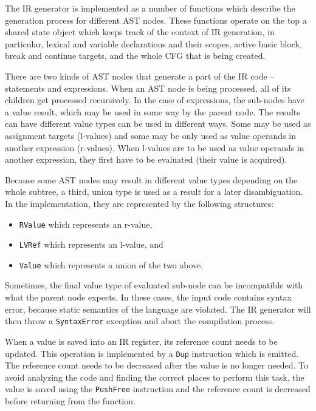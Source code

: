 The IR generator is implemented as a number of functions which describe the generation process for different AST nodes. These functions operate on the top a shared state object which keeps track of the context of IR generation, in particular, lexical and variable declarations and their scopes, active basic block, break and continue targets, and the whole CFG that is being created.

There are two kinds of AST nodes that generate a part of the IR code -- statements and expressions. When an AST node is being processed, all of its children get processed recursively. In the case of expressions, the sub-nodes have a value result, which may be used in some way by the parent node. The results can have different value types can be used in different ways. Some may be used as assignment targets (l-values) and some may be only used as value operands in another expression (r-values). When l-values are to be used as value operands in another expression, they first have to be evaluated (their value is acquired).

Because some AST nodes may result in different value types depending on the whole subtree, a third, union type is used as a result for a later disambiguation. In the implementation, they are represented by the following structures:
\begin{itemize}
\item \texttt{RValue} which represents an r-value,
\item \texttt{LVRef} which represents an l-value, and
\item \texttt{Value} which represents a union of the two above.
\end{itemize}

Sometimes, the final value type of evaluated sub-node can be incompatible with what the parent node expects. In these cases, the input code contains syntax error, because static semantics of the language are violated. The IR generator will then throw a \texttt{SyntaxError} exception and abort the compilation process.

When a value is saved into an IR register, its reference count needs to be updated. This operation is implemented by a \texttt{Dup} instruction which is emitted. The reference count needs to be decreased after the value is no longer needed. To avoid analyzing the code and finding the correct places to perform this task, the value is saved using the \texttt{PushFree} instruction and the reference count is decreased before returning from the function.

